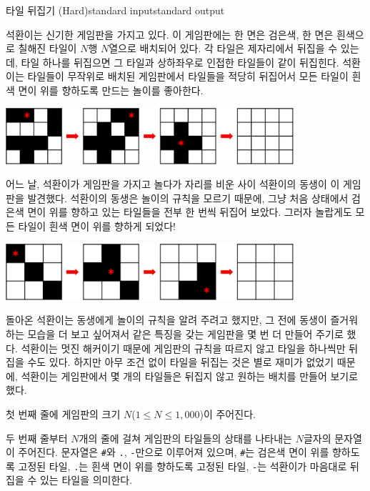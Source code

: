 \begin{problem}{타일 뒤집기 (Hard)}{standard input}{standard output}

석환이는 신기한 게임판을 가지고 있다. 이 게임판에는 한 면은 검은색, 한 면은 흰색으로 칠해진 타일이 $N$행 $N$열으로 배치되어 있다. 각 타일은 제자리에서 뒤집을 수 있는데, 타일 하나를 뒤집으면 그 타일과 상하좌우로 인접한 타일들이 같이 뒤집힌다. 석환이는 타일들이 무작위로 배치된 게임판에서 타일들을 적당히 뒤집어서 모든 타일이 흰색 면이 위를 향하도록 만드는 놀이를 좋아한다.

\begin{center}
  \includegraphics[width=0.8\textwidth]{tile1.png}
\end{center}

어느 날, 석환이가 게임판을 가지고 놀다가 자리를 비운 사이 석환이의 동생이 이 게임판을 발견했다. 석환이의 동생은 놀이의 규칙을 모르기 때문에, 그냥 처음 상태에서 검은색 면이 위를 향하고 있는 타일들을 전부 한 번씩 뒤집어 보았다. 그러자 놀랍게도 모든 타일이 흰색 면이 위를 향하게 되었다!

\begin{center}
  \includegraphics[width=0.8\textwidth]{tile2.png}
\end{center}

돌아온 석환이는 동생에게 놀이의 규칙을 알려 주려고 했지만, 그 전에 동생이 즐거워하는 모습을 더 보고 싶어져서 같은 특징을 갖는 게임판을 몇 번 더 만들어 주기로 했다. 석환이는 멋진 해커이기 때문에 게임판의 규칙을 따르지 않고 타일을 하나씩만 뒤집을 수도 있다. 하지만 아무 조건 없이 타일을 뒤집는 것은 별로 재미가 없었기 때문에, 석환이는 게임판에서 몇 개의 타일들은 뒤집지 않고 원하는 배치를 만들어 보기로 했다.

\InputFile
첫 번째 줄에 게임판의 크기 $N$($1 \le N \le 1,000$)이 주어진다.

두 번째 줄부터 $N$개의 줄에 걸쳐 게임판의 타일들의 상태를 나타내는 $N$글자의 문자열이 주어진다. 문자열은 \texttt{\#}와 \texttt{.}, \texttt{-}만으로 이루어져 있으며, \texttt{\#}는 검은색 면이 위를 향하도록 고정된 타일, \texttt{.}는 흰색 면이 위를 향하도록 고정된  타일, \texttt{-}는 석환이가 마음대로 뒤집을 수 있는 타일을 의미한다.


\end{problem}
